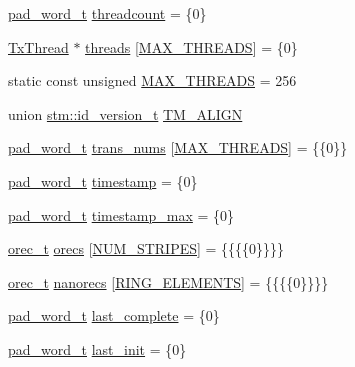 \begin{DoxyCompactItemize}
\item 
\hyperlink{structstm_1_1pad__word__t}{pad\-\_\-word\-\_\-t} \hyperlink{namespacestm_ac554ffc5ca7bee783d48142f1a0ff82b}{threadcount} = \{0\}
\item 
\hyperlink{structstm_1_1TxThread}{Tx\-Thread} $\ast$ \hyperlink{namespacestm_ab2acabe9f596fb07413e3a12fa14d570}{threads} \mbox{[}\hyperlink{namespacestm_a41da58ff755b92c2c2903c8e2844f6c4}{M\-A\-X\-\_\-\-T\-H\-R\-E\-A\-D\-S}\mbox{]} = \{0\}
\item 
static const unsigned \hyperlink{namespacestm_a41da58ff755b92c2c2903c8e2844f6c4}{M\-A\-X\-\_\-\-T\-H\-R\-E\-A\-D\-S} = 256
\item 
union \hyperlink{unionstm_1_1id__version__t}{stm\-::id\-\_\-version\-\_\-t} \hyperlink{namespacestm_ae247420ad0ba562827c2cbf18530c271}{T\-M\-\_\-\-A\-L\-I\-G\-N}
\item 
\hyperlink{structstm_1_1pad__word__t}{pad\-\_\-word\-\_\-t} \hyperlink{namespacestm_a8c60f91e3fafc640e3805be4fc4aa121}{trans\-\_\-nums} \mbox{[}\hyperlink{namespacestm_a41da58ff755b92c2c2903c8e2844f6c4}{M\-A\-X\-\_\-\-T\-H\-R\-E\-A\-D\-S}\mbox{]} = \{\{0\}\}
\item 
\hyperlink{structstm_1_1pad__word__t}{pad\-\_\-word\-\_\-t} \hyperlink{namespacestm_a8a8c42099bd04d1e89140ee02702f6e0}{timestamp} = \{0\}
\item 
\hyperlink{structstm_1_1pad__word__t}{pad\-\_\-word\-\_\-t} \hyperlink{namespacestm_a8d8dfb6b2b3438e3e104d5acbfbd7e71}{timestamp\-\_\-max} = \{0\}
\item 
\hyperlink{structstm_1_1orec__t}{orec\-\_\-t} \hyperlink{namespacestm_a59c4d1983c5d8a6640537726c4e8aed4}{orecs} \mbox{[}\hyperlink{namespacestm_ac333fa1ea03145d9c5d601624ab507eb}{N\-U\-M\-\_\-\-S\-T\-R\-I\-P\-E\-S}\mbox{]} = \{\{\{\{0\}\}\}\}
\item 
\hyperlink{structstm_1_1orec__t}{orec\-\_\-t} \hyperlink{namespacestm_a677ac5f80d97329f2058a0aca0bfb295}{nanorecs} \mbox{[}\hyperlink{namespacestm_aff01348819bdc4955bee1bfbecd22c1a}{R\-I\-N\-G\-\_\-\-E\-L\-E\-M\-E\-N\-T\-S}\mbox{]} = \{\{\{\{0\}\}\}\}
\item 
\hyperlink{structstm_1_1pad__word__t}{pad\-\_\-word\-\_\-t} \hyperlink{namespacestm_a17c110bd329d81ba81aef7210954a72d}{last\-\_\-complete} = \{0\}
\item 
\hyperlink{structstm_1_1pad__word__t}{pad\-\_\-word\-\_\-t} \hyperlink{namespacestm_ab0d9633930ec8c8921b11c64bf9cb890}{last\-\_\-init} = \{0\}
\item 

\end{DoxyCompactItemize}
